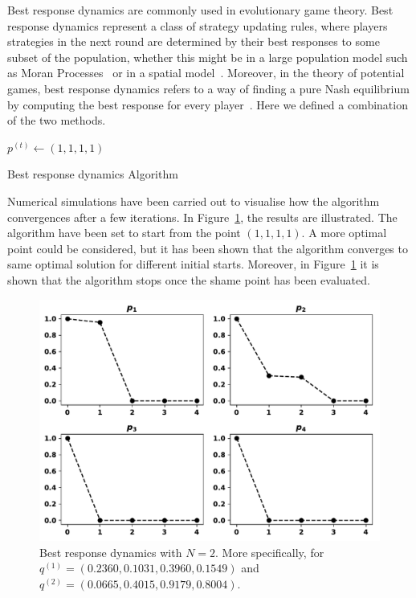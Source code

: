 \documentclass[10pt]{article}
\begin{document}
Best response dynamics are commonly used in evolutionary game theory. Best
response dynamics represent a class of strategy updating rules, where players
strategies in the next round are determined by their best responses to some
subset of the population, whether this might be in a large population model
such as Moran Processes~\cite{Knight2018} or in a spatial model~\cite{Nowak1992}.
Moreover, in the theory of potential games, best response dynamics
refers to a way of finding a pure Nash equilibrium by computing the best response for
every player~\cite{Nisan2007}. Here we defined a combination of the two methods.

%

\begin{algorithm}[H]
    $p^{(t)}\leftarrow (1, 1, 1, 1)$\;
    \caption{Best response dynamics Algorithm}
\end{algorithm}

Numerical simulations have been carried out to visualise how the algorithm
convergences after a few iterations. In Figure~\ref{fig:best_response_dynamics_results},
the results are illustrated. The algorithm have been set to start from the point
\((1, 1, 1, 1)\). A more optimal point could be considered, but it has been
shown that the algorithm converges to same optimal solution for different
initial starts. Moreover, in Figure~\ref{fig:best_response_dynamics_results}
it is shown that the algorithm stops once the shame point has been evaluated.

\begin{figure}
    \centering
    \includegraphics[width=.6\textwidth]{img/evolution_example_two.pdf}
    \caption{Best response dynamics with \(N=2\). More specifically, for
    \(q ^{(1)}=(0.2360,
                0.1031,
                0.3960,
                0.1549)\) and
    \(q ^{(2)}=(0.0665,
                0.4015,
                0.9179,
                0.8004)\).}
\label{fig:best_response_dynamics_results}
\end{figure}
\end{document}
